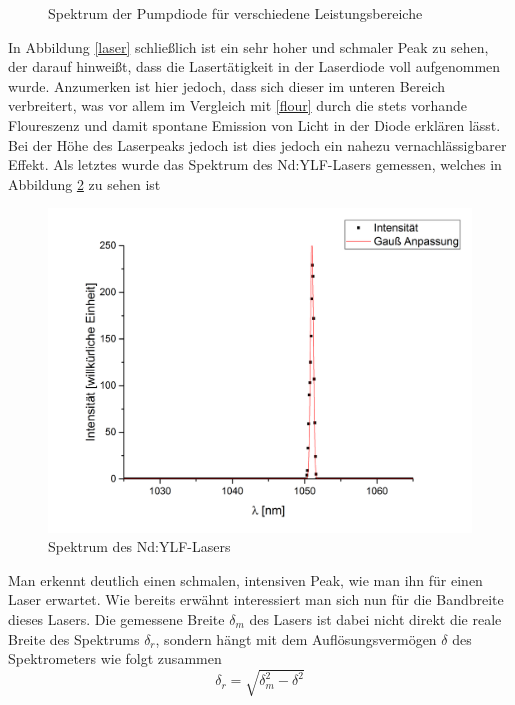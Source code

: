 \begin{figure}[H]
\begin{center}
		\caption{Spektrum der Pumpdiode für verschiedene Leistungsbereiche}
		\label{spek1}
	\end{center}
\end{figure}
In Abbildung \ref{laser} schließlich ist ein sehr hoher und schmaler Peak zu sehen, der darauf hinweißt, dass die Lasertätigkeit in der Laserdiode voll aufgenommen wurde. Anzumerken ist hier jedoch, dass sich dieser im unteren Bereich verbreitert, was vor allem im Vergleich mit \ref{flour} durch die stets vorhande Floureszenz und damit spontane Emission von Licht in der Diode erklären lässt. Bei der Höhe des Laserpeaks jedoch ist dies jedoch ein nahezu vernachlässigbarer Effekt. \newline
Als letztes wurde das Spektrum des Nd:YLF-Lasers gemessen, welches in  Abbildung \ref{lasery} zu sehen ist
\begin{figure}[H]
	\begin{center}
		\includegraphics[scale=.5]{Bilder/LaserY.png}
		\caption{Spektrum des Nd:YLF-Lasers}
		\label{lasery}
	\end{center}
\end{figure}
Man erkennt deutlich einen schmalen, intensiven Peak, wie man ihn für einen Laser erwartet. Wie bereits erwähnt interessiert man sich nun für die Bandbreite dieses Lasers. Die gemessene Breite $\delta_m$ des Lasers ist dabei nicht direkt die reale Breite des Spektrums $\delta_r$, sondern hängt mit dem Auflösungsvermögen $\delta$ des Spektrometers wie folgt zusammen
\begin{equation}
\delta_r=\sqrt{\delta_m^2-\delta^2}
\label{breite}
\end{equation}
